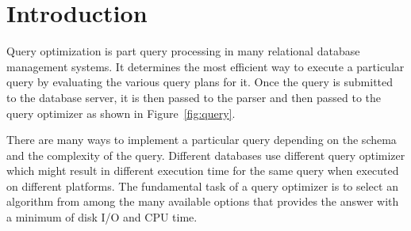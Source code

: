 
\section{Introduction}
\label{sec:intro}


Query optimization is part query processing in many relational database management systems. It determines the most efficient way to execute a particular query by evaluating the various query plans for it. Once the query is submitted to the database server, it is then passed to the parser and then passed to the query optimizer as shown in Figure~\ref{fig:query}.

There are many ways to implement a particular query depending on the schema and the complexity of the query. Different databases use different query optimizer which might result in different execution time for the same query when executed on different platforms. The fundamental task of a query optimizer is to select an algorithm from among the many available options that provides the answer with a minimum of disk I/O and CPU time.

